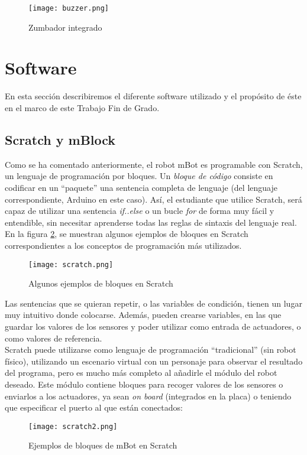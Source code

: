 \begin{figure}[H]
	\texttt{[image: buzzer.png]}
	\centering
	\caption{Zumbador integrado}
	\label{img:zumbador}
\end{figure}

\section{Software}\label{sec:software}
En esta sección describiremos el diferente software utilizado y el propósito de éste en el marco de este Trabajo Fin de Grado. 

\subsection{Scratch y mBlock}\label{subsec:scratch}
Como se ha comentado anteriormente, el robot mBot es programable con Scratch, un lenguaje de programación por bloques. Un \textit{bloque de código} consiste en codificar en un ``paquete'' una sentencia completa de lenguaje (del lenguaje correspondiente, Arduino en este caso). Así, el estudiante que utilice Scratch, será capaz de utilizar una sentencia \textit{if..else} o un bucle \textit{for} de forma muy fácil y entendible, sin necesitar aprenderse todas las reglas de sintaxis del lenguaje real. En la figura \ref{img:scratch}, se muestran algunos ejemplos de bloques en Scratch correspondientes a los conceptos de programación más utilizados.
\begin{figure}[H]
	\texttt{[image: scratch.png]}
	\centering
	\caption{Algunos ejemplos de bloques en Scratch}
	\label{img:scratch}
\end{figure}
Las sentencias que se quieran repetir, o las variables de condición, tienen un lugar muy intuitivo donde colocarse. Además, pueden crearse variables, en las que guardar los valores de los sensores y poder utilizar como entrada de actuadores, o como valores de referencia. \\
Scratch puede utilizarse como lenguaje de programación ``tradicional'' (sin robot físico), utilizando un escenario virtual con un personaje para observar el resultado del programa, pero es mucho más completo al añadirle el módulo del robot deseado. Este módulo contiene bloques para recoger valores de los sensores o enviarlos a los actuadores, ya sean \textit{on board} (integrados en la placa) o teniendo que especificar el puerto al que están conectados:
\begin{figure}[H]
	\texttt{[image: scratch2.png]}
	\centering
	\label{img:scratch2}
	\caption{Ejemplos de bloques de mBot en Scratch}
\end{figure}

